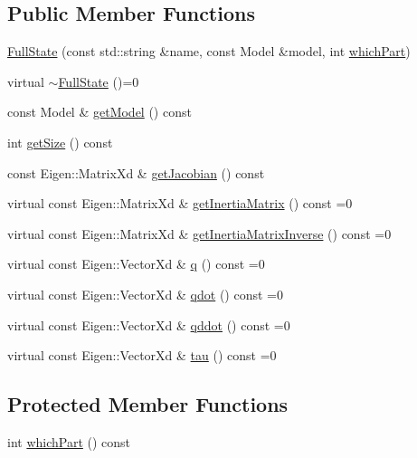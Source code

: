 \subsection*{Public Member Functions}
\begin{DoxyCompactItemize}
\item 
\hyperlink{classocra_1_1FullState_ae30ccfdd99c72531c1218b270d00c5df}{Full\+State} (const std\+::string \&name, const Model \&model, int \hyperlink{classocra_1_1FullState_a75ec7c039df8cb8608ebf34f7b779be5}{which\+Part})
\item 
virtual \hyperlink{classocra_1_1FullState_a7392bab88e107fe2862c01eb9c9bc1a4}{$\sim$\+Full\+State} ()=0
\item 
const Model \& \hyperlink{classocra_1_1FullState_a97f2718a0f72e69c829d67db4514af68}{get\+Model} () const
\item 
int \hyperlink{classocra_1_1FullState_a64f03f9385b36840d23e06de18a40112}{get\+Size} () const
\item 
const Eigen\+::\+Matrix\+Xd \& \hyperlink{classocra_1_1FullState_ada4a4e3af758b4af2ba95516eaad74e1}{get\+Jacobian} () const
\item 
virtual const Eigen\+::\+Matrix\+Xd \& \hyperlink{classocra_1_1FullState_a5d5c2ddfaf4868f78b4621d27b500784}{get\+Inertia\+Matrix} () const =0
\item 
virtual const Eigen\+::\+Matrix\+Xd \& \hyperlink{classocra_1_1FullState_a10f3a888554035bf13b3f636ce4b4edc}{get\+Inertia\+Matrix\+Inverse} () const =0
\item 
virtual const Eigen\+::\+Vector\+Xd \& \hyperlink{classocra_1_1FullState_a3bb03b513d7cb3a5447d1d4eb2d643b0}{q} () const =0
\item 
virtual const Eigen\+::\+Vector\+Xd \& \hyperlink{classocra_1_1FullState_a7018fe03dc3c8b3ec95d3c2015ae60e6}{qdot} () const =0
\item 
virtual const Eigen\+::\+Vector\+Xd \& \hyperlink{classocra_1_1FullState_a5882a53273cd9d3baae36b5850deadae}{qddot} () const =0
\item 
virtual const Eigen\+::\+Vector\+Xd \& \hyperlink{classocra_1_1FullState_a24723b4a382c2bf51e6c32cbd1bd7b06}{tau} () const =0
\end{DoxyCompactItemize}
\subsection*{Protected Member Functions}
\begin{DoxyCompactItemize}
\item 
int \hyperlink{classocra_1_1FullState_a75ec7c039df8cb8608ebf34f7b779be5}{which\+Part} () const
\end{DoxyCompactItemize}


